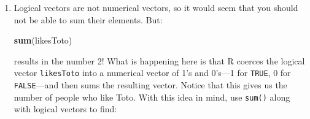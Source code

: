 \documentclass[]{book}
\makeatletter
\newenvironment{Shaded}{\begin{snugshade}}{\end{snugshade}}
\newcommand{\KeywordTok}[1]{\textcolor[rgb]{0.13,0.29,0.53}{\textbf{#1}}}
\newcommand{\DecValTok}[1]{\textcolor[rgb]{0.00,0.00,0.81}{#1}}
\newcommand{\StringTok}[1]{\textcolor[rgb]{0.31,0.60,0.02}{#1}}
\newcommand{\OtherTok}[1]{\textcolor[rgb]{0.56,0.35,0.01}{#1}}
\newcommand{\NormalTok}[1]{#1}
\providecommand{\tightlist}{%
  \setlength{\itemsep}{0pt}\setlength{\parskip}{0pt}}
\newenvironment{kframe}{%
\medskip{}
\setlength{\fboxsep}{.8em}
 \def\at@end@of@kframe{}%
 \ifinner\ifhmode%
  \def\at@end@of@kframe{\end{minipage}}%
  \begin{minipage}{\columnwidth}%
 \fi\fi%
 \def\FrameCommand##1{\hskip\@totalleftmargin \hskip-\fboxsep
 \colorbox{shadecolor}{##1}\hskip-\fboxsep
     \hskip-\linewidth \hskip-\@totalleftmargin \hskip\columnwidth}%
 \MakeFramed {\advance\hsize-\width
   \@totalleftmargin\z@ \linewidth\hsize
   \@setminipage}}%
 {\par\unskip\endMakeFramed%
 \at@end@of@kframe}
\renewenvironment{Shaded}{\begin{kframe}}{\end{kframe}}
\theoremstyle{definition}
\theoremstyle{definition}
\theoremstyle{definition}
\theoremstyle{remark}
\makeatother
\begin{document}
{\begin{enumerate}
\begin{Shaded}
\begin{Highlighting}[]
\NormalTok{person <-}\StringTok{ }\KeywordTok{c}\NormalTok{(}\StringTok{"Akash"}\NormalTok{, }\StringTok{"Bee"}\NormalTok{, }\StringTok{"Celia"}\NormalTok{, }\StringTok{"Devadatta"}\NormalTok{, }\StringTok{"Enid"}\NormalTok{)}
\NormalTok{age <-}\StringTok{ }\KeywordTok{c}\NormalTok{(}\DecValTok{23}\NormalTok{, }\DecValTok{21}\NormalTok{, }\DecValTok{22}\NormalTok{, }\DecValTok{25}\NormalTok{, }\DecValTok{63}\NormalTok{)}
\NormalTok{height <-}\StringTok{ }\KeywordTok{c}\NormalTok{(}\DecValTok{68}\NormalTok{, }\DecValTok{67}\NormalTok{, }\DecValTok{71}\NormalTok{, }\DecValTok{70}\NormalTok{, }\DecValTok{69}\NormalTok{)}
\NormalTok{likesToto <-}\StringTok{ }\KeywordTok{c}\NormalTok{(}\OtherTok{TRUE}\NormalTok{, }\OtherTok{TRUE}\NormalTok{, }\OtherTok{FALSE}\NormalTok{, }\OtherTok{FALSE}\NormalTok{, }\OtherTok{TRUE}\NormalTok{)}
\end{Highlighting}
\end{Shaded}

  Use sub-setting with logical vectors to produce vectors of:

  \begin{enumerate}
  \def\labelenumii{\arabic{enumii}.}
  \tightlist
  \item
    the names of all people over the age of 22;
  \item
    the names of all people younger than 24 who are also more than 67
    inches tall;
  \item
    the names of all people who either don't like Toto or who are over
    the age of 30;
  \item
    the \emph{number} of people who are over the age of 22.
  \end{enumerate}
\item
  Logical vectors are not numerical vectors, so it would seem that you
  should not be able to sum their elements. But:

\begin{Shaded}
\begin{Highlighting}[]
\KeywordTok{sum}\NormalTok{(likesToto)}
\end{Highlighting}
\end{Shaded}

  results in the number 2! What is happening here is that R coerces the
  logical vector \texttt{likesToto} into a numerical vector of 1's and
  0's---1 for \texttt{TRUE}, 0 for \texttt{FALSE}---and then sums the
  resulting vector. Notice that this gives us the number of people who
  like Toto. With this idea in mind, use \texttt{sum()} along with
  logical vectors to find:


\end{enumerate}}
\end{document}
